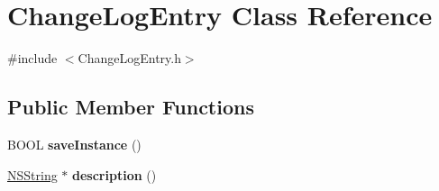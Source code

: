 \hypertarget{interface_change_log_entry}{
\section{\-Change\-Log\-Entry \-Class \-Reference}
\label{interface_change_log_entry}
}


{\ttfamily \#include $<$\-Change\-Log\-Entry.\-h$>$}

\subsection*{\-Public \-Member \-Functions}
\begin{DoxyCompactItemize}
\item 
\hypertarget{interface_change_log_entry_a9395625a4d521e17efb8ca46669d50c1}{
\-B\-O\-O\-L {\bfseries save\-Instance} ()}
\label{interface_change_log_entry_a9395625a4d521e17efb8ca46669d50c1}

\item 
\hypertarget{interface_change_log_entry_a7c7d145fda130fbddf245d5de3b2b7d5}{
\hyperlink{class_n_s_string}{\-N\-S\-String} $\ast$ {\bfseries description} ()}
\label{interface_change_log_entry_a7c7d145fda130fbddf245d5de3b2b7d5}

\end{DoxyCompactItemize}
